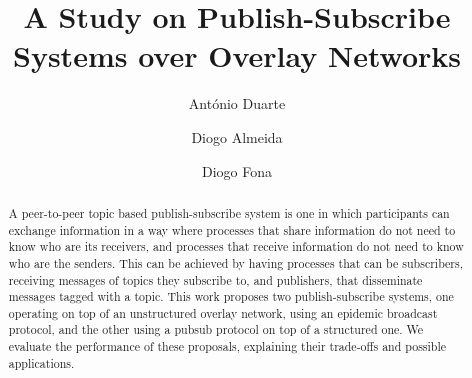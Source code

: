 \documentclass[sigconf]{acmart}
\begin{document}
\title{A Study on Publish-Subscribe Systems over Overlay Networks}

\author{António Duarte}

\author{Diogo Almeida}

\author{Diogo Fona}

\renewcommand{\shortauthors}{Duarte, Almeida, and Fona.}

\begin{abstract}
A peer-to-peer topic based publish-subscribe system is one in which participants can exchange information in a way where processes that share information do not need to know who are its receivers, and processes that receive information do not need to know who are the senders. This can be achieved by having processes that can be subscribers, receiving messages of topics they subscribe to, and publishers, that disseminate messages tagged with a topic.
This work proposes two publish-subscribe systems, one operating on top of an unstructured overlay network, using an epidemic broadcast protocol, and the other using a pubsub protocol on top of a structured one. We evaluate the performance of these proposals, explaining their trade-offs and possible applications.
\end{abstract} 

\maketitle
\end{document}
